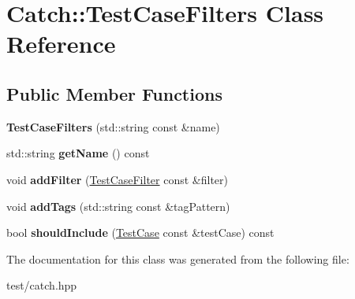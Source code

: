 \hypertarget{classCatch_1_1TestCaseFilters}{}\section{Catch\+:\+:Test\+Case\+Filters Class Reference}
\label{classCatch_1_1TestCaseFilters}
\subsection*{Public Member Functions}
\begin{DoxyCompactItemize}
\item 
{\bfseries Test\+Case\+Filters} (std\+::string const \&name)\hypertarget{classCatch_1_1TestCaseFilters_aeaf3582868c07dfae6a31366c7964a92}{}\label{classCatch_1_1TestCaseFilters_aeaf3582868c07dfae6a31366c7964a92}

\item 
std\+::string {\bfseries get\+Name} () const \hypertarget{classCatch_1_1TestCaseFilters_a2acf97540f4fc9979a4c46068bc908d6}{}\label{classCatch_1_1TestCaseFilters_a2acf97540f4fc9979a4c46068bc908d6}

\item 
void {\bfseries add\+Filter} (\hyperlink{classCatch_1_1TestCaseFilter}{Test\+Case\+Filter} const \&filter)\hypertarget{classCatch_1_1TestCaseFilters_a7f1ffd2e932d90a80d6dc6279ff9216d}{}\label{classCatch_1_1TestCaseFilters_a7f1ffd2e932d90a80d6dc6279ff9216d}

\item 
void {\bfseries add\+Tags} (std\+::string const \&tag\+Pattern)\hypertarget{classCatch_1_1TestCaseFilters_a77d8212d883341c8de88d01f4c419d83}{}\label{classCatch_1_1TestCaseFilters_a77d8212d883341c8de88d01f4c419d83}

\item 
bool {\bfseries should\+Include} (\hyperlink{classCatch_1_1TestCase}{Test\+Case} const \&test\+Case) const \hypertarget{classCatch_1_1TestCaseFilters_a8cb88af0aee7449c3409891948e51d3b}{}\label{classCatch_1_1TestCaseFilters_a8cb88af0aee7449c3409891948e51d3b}

\end{DoxyCompactItemize}


The documentation for this class was generated from the following file\+:\begin{DoxyCompactItemize}
\item 
test/catch.\+hpp\end{DoxyCompactItemize}
